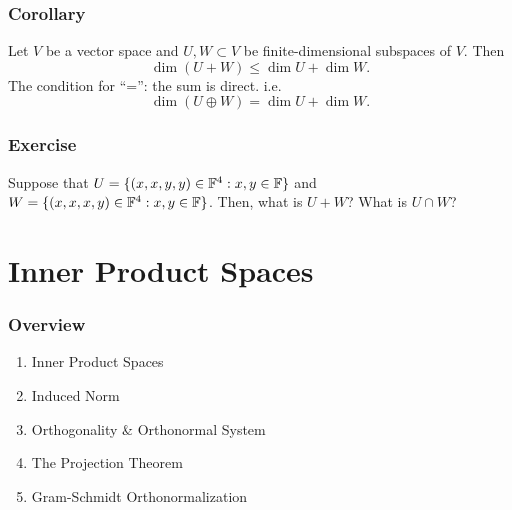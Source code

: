 \documentclass[12pt, t]{beamer}
\newcommand{\nullspace}{~\\[15pt]}
\begin{document}
\begin{frame}
    \frametitle{Corollary}
    Let $V$ be a vector space and $U,W\subset V$ be finite-dimensional subspaces of $V$. Then
    \[\dim(U+W)\leq\dim U+\dim W.\]
    The condition for ``='': the sum is direct. i.e.
    \[\dim(U\oplus W)=\dim U+\dim W.\]
\end{frame}

\begin{frame}
    \frametitle{Exercise}
    Suppose that $U=\{(x,x,y,y)\in\mathbb{F}^4:x,y\in\mathbb{F}\}$ and $W=\{(x,x,x,y)\in\mathbb{F}^4:x,y\in\mathbb{F}\}$. Then, what is $U+W$? What is $U\cap W$? 
\end{frame}

\section{Inner Product Spaces}
\begin{frame}
    \frametitle{Overview}
    \begin{enumerate}
        \item Inner Product Spaces
        \item Induced Norm
        \item Orthogonality \& Orthonormal System
        \item The Projection Theorem
        \item Gram-Schmidt Orthonormalization
    \end{enumerate}

\end{frame}
\end{document}
